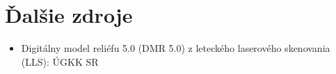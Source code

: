 \documentclass[12pt]{article}
\begin{document}
\begin{itemize}
\end{itemize}

\section*{Ďalšie zdroje}
\begin{itemize}
    \item Digitálny model reliéfu 5.0 (DMR 5.0) z leteckého laserového skenovania (LLS): ÚGKK SR
\end{itemize}
\end{document}
